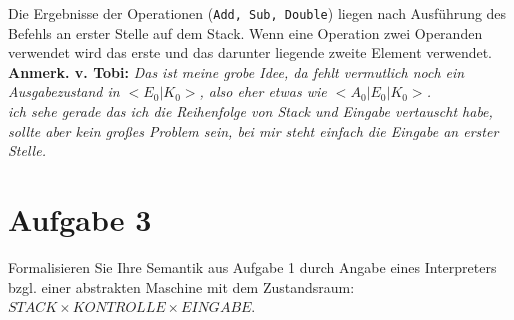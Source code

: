 \documentclass[ngerman,a4paper]{report}
\begin{document}
Die Ergebnisse der Operationen (\lstinline!Add, Sub, Double!) liegen nach Ausführung des Befehls an erster Stelle auf dem Stack. Wenn eine Operation zwei Operanden verwendet wird das erste und das darunter liegende zweite Element verwendet.\\
\textbf{Anmerk. v. Tobi:} \emph{Das ist meine grobe Idee, da fehlt vermutlich noch ein Ausgabezustand in $<E_0|K_0>$, also eher etwas wie $<A_0|E_0|K_0>$.\\ ich sehe gerade das ich die Reihenfolge von Stack und Eingabe vertauscht habe, sollte aber kein großes Problem sein, bei mir steht einfach die Eingabe an erster Stelle.}\\
\section*{Aufgabe 3}
Formalisieren Sie Ihre Semantik aus Aufgabe 1 durch Angabe eines Interpreters bzgl. einer abstrakten Maschine mit dem Zustandsraum: $STACK \times KONTROLLE \times EINGABE$.\\
\end{document}
